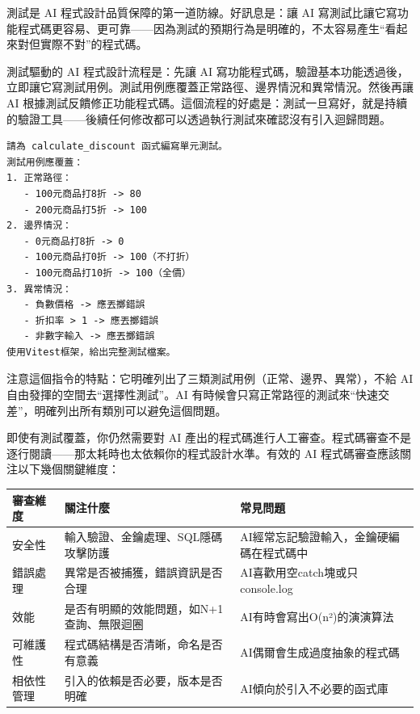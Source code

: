 


測試是 AI 程式設計品質保障的第一道防線。好訊息是：讓 AI 寫測試比讓它寫功能程式碼更容易、更可靠——因為測試的預期行為是明確的，不太容易產生“看起來對但實際不對”的程式碼。

測試驅動的 AI 程式設計流程是：先讓 AI 寫功能程式碼，驗證基本功能透過後，立即讓它寫測試用例。測試用例應覆蓋正常路徑、邊界情況和異常情況。然後再讓 AI 根據測試反饋修正功能程式碼。這個流程的好處是：測試一旦寫好，就是持續的驗證工具——後續任何修改都可以透過執行測試來確認沒有引入迴歸問題。

\begin{lstlisting}
請為 calculate_discount 函式編寫單元測試。
測試用例應覆蓋：
1. 正常路徑：
   - 100元商品打8折 -> 80
   - 200元商品打5折 -> 100
2. 邊界情況：
   - 0元商品打8折 -> 0
   - 100元商品打0折 -> 100（不打折）
   - 100元商品打10折 -> 100（全價）
3. 異常情況：
   - 負數價格 -> 應丟擲錯誤
   - 折扣率 > 1 -> 應丟擲錯誤
   - 非數字輸入 -> 應丟擲錯誤
使用Vitest框架，給出完整測試檔案。
\end{lstlisting}

注意這個指令的特點：它明確列出了三類測試用例（正常、邊界、異常），不給 AI 自由發揮的空間去“選擇性測試”。AI 有時候會只寫正常路徑的測試來“快速交差”，明確列出所有類別可以避免這個問題。


即使有測試覆蓋，你仍然需要對 AI 產出的程式碼進行人工審查。程式碼審查不是逐行閱讀——那太耗時也太依賴你的程式設計水準。有效的 AI 程式碼審查應該關注以下幾個關鍵維度：

\begin{center}
\begin{tabularx}{\linewidth}{|X|X|X|}
\hline
\textbf{審查維度} & \textbf{關注什麼} & \textbf{常見問題} \tabularnewline
\hline
安全性 & 輸入驗證、金鑰處理、SQL隱碼攻擊防護 & AI經常忘記驗證輸入，金鑰硬編碼在程式碼中 \tabularnewline
錯誤處理 & 異常是否被捕獲，錯誤資訊是否合理 & AI喜歡用空catch塊或只console.log \tabularnewline
效能 & 是否有明顯的效能問題，如N+1查詢、無限迴圈 & AI有時會寫出O(n²)的演演算法 \tabularnewline
可維護性 & 程式碼結構是否清晰，命名是否有意義 & AI偶爾會生成過度抽象的程式碼 \tabularnewline
相依性管理 & 引入的依賴是否必要，版本是否明確 & AI傾向於引入不必要的函式庫 \tabularnewline
\hline
\end{tabularx}
\end{center}

